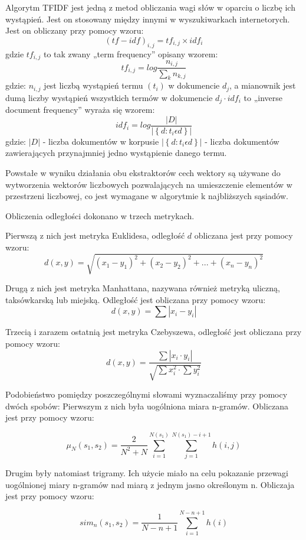 \documentclass{classrep}
\begin{document}
	Algorytm TFIDF jest jedną z metod obliczania wagi słów w oparciu o liczbę ich wystąpień. Jest on stosowany między innymi w wyszukiwarkach internetorych. Jest on obliczany przy pomocy wzoru:
\[ \left ( tf-idf \right )_{i,j}=tf_{i,j} \times idf_{i} \]
gdzie \( tf_{i,j} \) to tak zwany „term frequency” opisany wzorem:
\[ tf_{i,j}=log \frac{n_{i,j}}{\sum _{k}n_{k,j}} \]
gdzie: \( n_{i,j} \) jest liczbą wystąpień termu \( \left ( t_{i} \right ) \) w dokumencie \( d_{j}\), a mianownik jest dumą liczby wystąpień wszystkich termów w dokumencie \( d_{j} \cdot idf_{i} \) to „inverse document frequency” wyraża się wzorem:
\[ idf_{i}=log \frac{|D|}{| \left \{ d: t_{i} \epsilon d \right \} |} \]
gdzie:
\( |D| \) - liczba dokumentów w korpusie
\( | \left \{ d: t_{i} \epsilon d \right \} | \) - liczba dokumentów zawierających przynajmniej jedno wystąpienie danego termu.

	Powstałe w wyniku działania obu ekstraktorów cech wektory są używane do wytworzenia wektorów liczbowych pozwalających na umieszczenie elementów w przestrzeni liczbowej, co jest wymagane w algorytmie k najbliższych sąsiadów.
	
	Obliczenia odległości dokonano w trzech metrykach.
	
	Pierwszą z nich jest metryka Euklidesa, odległość \( d \) obliczana jest przy pomocy wzoru: 
\[ d\left ( x,y \right )=\sqrt{\left ( x_{1}-y_{1} \right )^{2} + \left ( x_{2}-y_{2} \right )^{2} + ... + \left ( x_{n}-y_{n} \right )^{2}} \]

	Drugą z nich jest metryka Manhattana, nazywana również metryką uliczną, taksówkarską lub miejską. Odległość jest obliczana przy pomocy wzoru:
\[ d\left ( x,y \right )=\sum|x_{i}-y_{i}| \]

	Trzecią i zarazem ostatnią jest metryka Czebyszewa, odległość jest obliczana przy pomocy wzoru:
\[ d\left ( x,y \right )=\frac{\sum|x_{i} \cdot y_{i}|}{\sqrt{ \sum x_{i}^{2} \cdot \sum y_{i}^{2} }} \]

	Podobieństwo pomiędzy poszczególnymi słowami wyznaczaliśmy przy pomocy dwóch spobów:
Pierwszym z nich była uogólniona miara n-gramów. Obliczana jest przy pomocy wzoru:

$$ \mu_{N}(s_{1}, s_{2})= \frac{2}{N^{2} + N}  \sum_{i=1}^{N(s_{1})} \sum_{j=1}^{N(s_{1})-i+1}  h(i,j) $$

Drugim były natomiast trigramy. Ich użycie miało na celu pokazanie przewagi uogólnionej miary n-gramów nad miarą z jednym jasno określonym n. Obliczaja jest przy pomocy wzoru:

$$ sim_{n}(s_{1}, s_{2}) = \frac{1}{N - n + 1} \sum_{i = 1}^{N-n+1} h(i) $$
\end{document}
